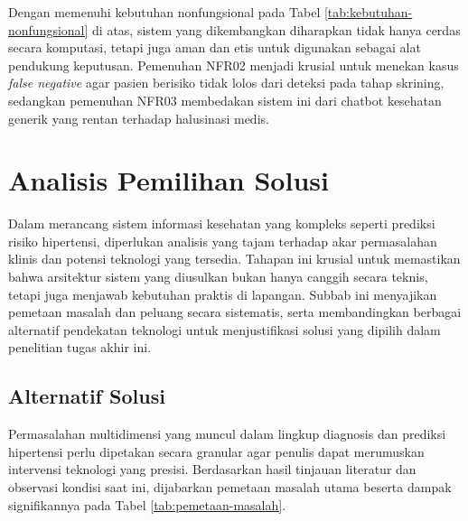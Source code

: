 Dengan memenuhi kebutuhan nonfungsional pada Tabel \ref{tab:kebutuhan-nonfungsional} di atas, sistem yang dikembangkan diharapkan tidak hanya cerdas secara komputasi, tetapi juga aman dan etis untuk digunakan sebagai alat pendukung keputusan. Pemenuhan NFR02 menjadi krusial untuk menekan kasus \emph{false negative} agar pasien berisiko tidak lolos dari deteksi pada tahap skrining, sedangkan pemenuhan NFR03 membedakan sistem ini dari chatbot kesehatan generik yang rentan terhadap halusinasi medis.

\section{Analisis Pemilihan Solusi}
Dalam merancang sistem informasi kesehatan yang kompleks seperti prediksi risiko hipertensi, diperlukan analisis yang tajam terhadap akar permasalahan klinis dan potensi teknologi yang tersedia. Tahapan ini krusial untuk memastikan bahwa arsitektur sistem yang diusulkan bukan hanya canggih secara teknis, tetapi juga menjawab kebutuhan praktis di lapangan. Subbab ini menyajikan pemetaan masalah dan peluang secara sistematis, serta membandingkan berbagai alternatif pendekatan teknologi untuk menjustifikasi solusi yang dipilih dalam penelitian tugas akhir ini.

\subsection{Alternatif Solusi}
Permasalahan multidimensi yang muncul dalam lingkup diagnosis dan prediksi hipertensi perlu dipetakan secara granular agar penulis dapat merumuskan intervensi teknologi yang presisi. Berdasarkan hasil tinjauan literatur dan observasi kondisi saat ini, dijabarkan pemetaan masalah utama beserta dampak signifikannya pada Tabel \ref{tab:pemetaan-masalah}.

